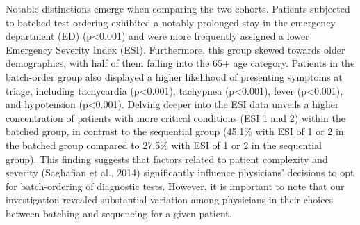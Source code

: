 \documentclass[,,nonblindrev]{informs}
\begin{document}
Notable distinctions emerge when comparing the two cohorts. Patients
subjected to batched test ordering exhibited a notably prolonged stay in
the emergency department (ED) (p\textless0.001) and were more frequently
assigned a lower Emergency Severity Index (ESI). Furthermore, this group
skewed towards older demographics, with half of them falling into the
65+ age category. Patients in the batch-order group also displayed a
higher likelihood of presenting symptoms at triage, including
tachycardia (p\textless0.001), tachypnea (p\textless0.001), fever
(p\textless0.001), and hypotension (p\textless0.001). Delving deeper
into the ESI data unveils a higher concentration of patients with more
critical conditions (ESI 1 and 2) within the batched group, in contrast
to the sequential group (45.1\% with ESI of 1 or 2 in the batched group
compared to 27.5\% with ESI of 1 or 2 in the sequential group). This
finding suggests that factors related to patient complexity and severity
(Saghafian et al., 2014) significantly influence physicians' decisions
to opt for batch-ordering of diagnostic tests. However, it is important
to note that our investigation revealed substantial variation among
physicians in their choices between batching and sequencing for a given
patient.
\end{document}
